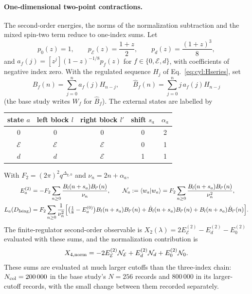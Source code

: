 \documentclass[11pt,a4paper]{article}
\numberwithin{equation}{section}
\begin{document}
\paragraph{One-dimensional two-point contractions.} The second-order energies, the norms of the normalization
subtraction and the mixed spin-two term reduce to one-index sums. Let
\begin{equation}
 p_0(z)=1,\qquad p_{\mathcal E}(z)=\frac{1+z}{2},\qquad p_d(z)=\frac{(1+z)^3}{8},
\end{equation}
and $a_f(j)=[z^j](1-z)^{-1/8}p_f(z)$ for $f\in\{0,\mathcal E,d\}$, with coefficients of negative index zero. With the
regulated sequence $H_j$ of Eq.~\eqref{eq:cyl:Hseries}, set
\begin{equation}
 B_f(n)=\sum_{j=0}^na_f(j)H_{n-j},\qquad \hat B_f(n)=\sum_{j=0}^nj\,a_f(j)H_{n-j}
\end{equation}
(the base study writes $W_f$ for $\hat B_f$). The external states are labelled by
\begin{center}\small
\begin{tabular}{@{}ccccc@{}}
\toprule
state $a$ & left block $l$ & right block $l'$ & shift $s_a$ & $\alpha_a$\\
\midrule
$0$ & $0$ & $0$ & 0 & 2\\
$\mathcal E$ & $\mathcal E$ & $\mathcal E$ & 0 & 1\\
$d$ & $d$ & $\mathcal E$ & 1 & 1\\
\bottomrule
\end{tabular}
\end{center}
With $F_2=(2\pi)^2q^{\Delta_{\chi,0}}$ and $\nu_n=2n+\alpha_a$,
\begin{equation}
\begin{aligned}
 E_a^{(2)}&=-F_2\sum_{n\ge0}\frac{B_l(n+s_a)B_{l'}(n)}{\nu_n},\qquad
 \mathcal N_a:=\langle w_a\vert w_a\rangle=F_2\sum_{n\ge0}\frac{B_l(n+s_a)B_{l'}(n)}{\nu_n^2},\\
 L_a(D_{\rm Ising})&=F_2\sum_{n\ge0}\frac1{\nu_n^2}\Bigl[\bigl(\tfrac18-E_a^{(0)}\bigr)B_l(n+s_a)B_{l'}(n)
 +\hat B_l(n+s_a)B_{l'}(n)+B_l(n+s_a)\hat B_{l'}(n)\Bigr].
\end{aligned}
\label{eq:cyl:collapsed}
\end{equation}
The finite-regulator second-order observable is $X_2(\lambda)=2E_{\mathcal E}^{(2)}-E_d^{(2)}-E_0^{(2)}$ evaluated with
these sums, and the normalization contribution is
\begin{equation}
 X_{4,\rm norm}=-2E_{\mathcal E}^{(2)}\mathcal N_{\mathcal E}+E_d^{(2)}\mathcal N_d+E_0^{(2)}\mathcal N_0.
\end{equation}
These sums are evaluated at much larger cutoffs than the three-index chain: $N_{\rm col}=200\,000$ in the base study's
$N=256$ records and $800\,000$ in its larger-cutoff records, with the small change between them recorded separately.
\end{document}
